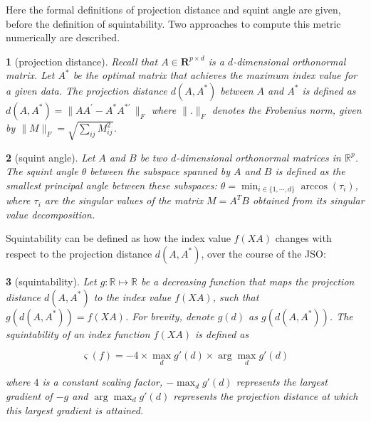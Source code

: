 \documentclass[
  12pt,
]{interact}
\theoremstyle{plain}
\newtheorem{defn}{\protect\definitionname}
\providecommand{\definitionname}{Definition}
\begin{document}
Here the formal definitions of projection distance and squint angle are
given, before the definition of squintability. Two approaches to compute
this metric numerically are described.

\begin{defn}[projection distance]\label{def:proj-dist}
Recall that $A \in \mathbf{R}^{p \times d}$ is a $d$-dimensional orthonormal matrix. Let $A^*$ be the optimal matrix that achieves the maximum index value for a given data. The projection distance $d(A, A^*)$ between $A$ 
and $A^*$ is defined as 
$d(A, A^*) = \lVert AA^\prime - A^*A^{*\prime}\,\rVert _F$
where $\lVert . \rVert _F$ denotes the Frobenius norm, given by
$\lVert M \rVert _F = \sqrt{\sum_{ij} M_{ij}^2}$. 
\end{defn}

\begin{defn}[squint angle]\label{def:squint-angle}
Let $A$ and $B$ be two $d$-dimensional orthonormal matrices in $\mathbb{R}^p$. The squint angle $\theta$ between the subspace spanned by $A$ and $B$ is defined as the smallest principal angle between these subspaces: $\theta = \min_{i \in \{1, \cdots, d\}} \arccos(\tau_i)$, where $\tau_i$ are the singular values of the matrix $M = A^T B$ obtained from its singular value decomposition.

\end{defn}

Squintability can be defined as how the index value \(f(XA)\) changes
with respect to the projection distance \(d(A, A^*)\), over the course
of the JSO:

\begin{defn}[squintability]\label{def:squintability}
Let $g: \mathbb{R} \mapsto  \mathbb{R}$ be a decreasing function that maps the projection distance $d(A, A^*)$ to the index value $f(XA)$, such that $g(d(A, A^*)) = f(XA)$. For brevity, denote $g(d)$ as $g(d(A, A^*))$. The squintability of an index function $f(XA)$ is defined as 

\begin{equation}
\varsigma(f) = -4 \times \max_{d} g'(d) \times \arg \max_{d} g'(d)
\label{eq-squintability}
\end{equation}

where $4$ is a constant scaling factor, $-\max_d g'(d)$ represents the 
largest gradient of $-g$ and $\arg \max_{d} g'(d)$ represents the projection distance at which this largest gradient is attained.

\end{defn}
\end{document}
